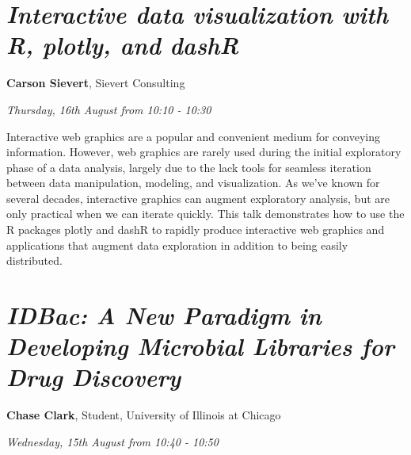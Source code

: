 \documentclass[]{book}
\theoremstyle{definition}
\theoremstyle{definition}
\theoremstyle{definition}
\theoremstyle{remark}
\begin{document}
\hypertarget{interactive-data-visualization-with-r-plotly-and-dashr}{%
\section{\texorpdfstring{\emph{Interactive data visualization with R,
plotly, and
dashR}}{Interactive data visualization with R, plotly, and dashR}}\label{interactive-data-visualization-with-r-plotly-and-dashr}}

\textbf{Carson Sievert}, Sievert Consulting

\emph{Thursday, 16th August from 10:10 - 10:30}

Interactive web graphics are a popular and convenient medium for
conveying information. However, web graphics are rarely used during the
initial exploratory phase of a data analysis, largely due to the lack
tools for seamless iteration between data manipulation, modeling, and
visualization. As we've known for several decades, interactive graphics
can augment exploratory analysis, but are only practical when we can
iterate quickly. This talk demonstrates how to use the R packages plotly
and dashR to rapidly produce interactive web graphics and applications
that augment data exploration in addition to being easily distributed.

\hypertarget{idbac-a-new-paradigm-in-developing-microbial-libraries-for-drug-discovery}{%
\section{\texorpdfstring{\emph{IDBac: A New Paradigm in Developing
Microbial Libraries for Drug
Discovery}}{IDBac: A New Paradigm in Developing Microbial Libraries for Drug Discovery}}\label{idbac-a-new-paradigm-in-developing-microbial-libraries-for-drug-discovery}}

\textbf{Chase Clark}, Student, University of Illinois at Chicago

\emph{Wednesday, 15th August from 10:40 - 10:50}
\end{document}

